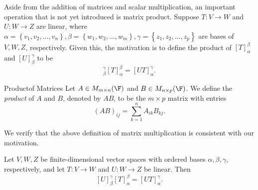 \documentclass[linearalgebra]{subfiles}
\begin{document}
    \begin{remark}
        Aside from the addition of matrices and scalar multiplication, an important operation that is not yet introduced is matrix product. Suppose $T: V\to W$ and $U: W\to Z$ are linear, where $\alpha = \left\lbrace v_1, v_2, \ldots, v_n \right\rbrace, \beta = \left\lbrace w_1, w_2, \ldots, w_m \right\rbrace, \gamma = \left\lbrace z_1, z_2, \ldots, z_p \right\rbrace$ are bases of $V, W, Z$, respectively. Given this, the motivation is to define the product of $[T]^\beta_\alpha$ and $[U]^\gamma_\beta$ to be
        \begin{equation*}
            [U]^\gamma_\beta [T]^\beta_\alpha = [UT]^\gamma_\alpha.
        \end{equation*}
    \end{remark}

    \begin{definition}{Product}{of Matrices}
        Let $A\in M_{m\times n}(\F)$ and $B\in M_{n\times p}(\F)$. We define the \emph{product} of $A$ and $B$, denoted by $AB$, to be the $m\times p$ matrix with entries
        \begin{equation*}
            \left( AB \right) _{ij} = \sum^{n}_{k=1} A_{ik}B_{kj}.
        \end{equation*}
    \end{definition}

    \begin{remark}
        We verify that the above definition of matrix multiplication is consistent with our motivation. 
    \end{remark}

    \begin{prop}{}
        Let $V, W, Z$ be finite-dimensional vector spaces with ordered bases $\alpha, \beta, \gamma$, respectively, and let $T:V\to W$ and $U:W\to Z$ be linear. Then
        \begin{equation*}
            \left[ U \right] ^\gamma_\beta \left[ T \right] ^\beta_\alpha = \left[ UT \right] ^\gamma_\alpha.
        \end{equation*}
    \end{prop}
\end{document}
